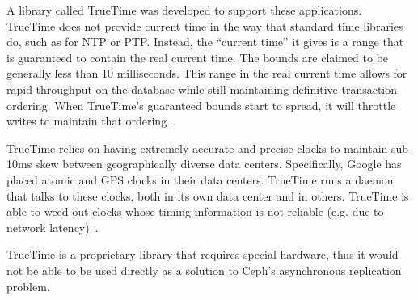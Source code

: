 A library called TrueTime was developed to support these applications.
TrueTime does not provide current time in the way that standard time
libraries do, such as for NTP or PTP. Instead, the ``current time'' it gives is a range that is guaranteed to contain
the real current time. The bounds are claimed to be generally less than 10
milliseconds. This range in the real current time allows for rapid 
throughput on the database while still maintaining definitive transaction ordering. When TrueTime's guaranteed bounds start to spread, 
it will throttle writes to maintain that ordering~\citep{Corbett2012}.

TrueTime relies on having extremely accurate and precise clocks 
to maintain sub-10ms skew between geographically diverse data centers. Specifically, Google has placed atomic and GPS clocks in their data 
centers. TrueTime runs a daemon that talks to these clocks, both in its own data center and in others. TrueTime is able to weed out clocks whose 
timing information is not reliable 
(e.g. due to network latency)~\citep{Corbett2012}.

TrueTime is a proprietary
library that requires special hardware, thus it would not be able to
be used directly as a solution to Ceph's asynchronous replication
problem. 

